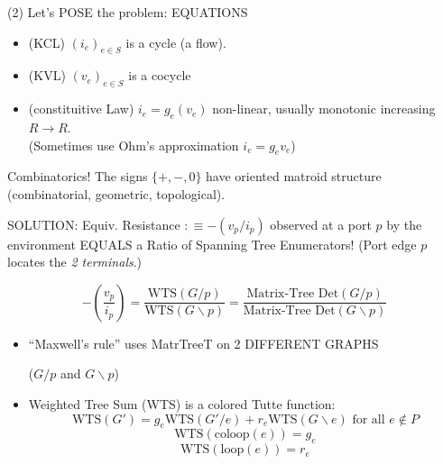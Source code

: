 \documentclass{beamer}
\begin{document}
\begin{frame}{(2) Let's POSE the problem: EQUATIONS}
\begin{itemize}
\item 
(KCL) $(i_e)_{e\in S}$ is a cycle (a flow).
\item
(KVL) $(v_e)_{e\in S}$ is a cocycle
\item
(constituitive Law) $i_e=g_e(v_e)$
non-linear, usually monotonic increasing $R\rightarrow R$.\\ 
(Sometimes use Ohm's approximation $i_e=g_ev_e$)
\end{itemize}
\begin{block}{Combinatorics!}
The signs $\{ +, -, 0\}$ have oriented matroid structure
(combinatorial, geometric, topological).
\end{block}
\end{frame}



\begin{frame}{SOLUTION: Equiv. Resistance $ :\equiv -(v_p/i_p)$
observed at a port $p$ by the environment
EQUALS a Ratio of Spanning Tree Enumerators!
(Port edge $p$ locates the \textit{2 terminals}.)}

\[
-(\frac{v_p}{i_p})=\frac{\mbox{WTS}(G/p)}
{\mbox{WTS}(G\backslash p)} 
= \frac{\mbox{Matrix-Tree Det}(G/p)}
       {\mbox{Matrix-Tree Det}(G\backslash p)}
\]
\begin{itemize}
\item
``Maxwell's rule'' uses MatrTreeT on 2 DIFFERENT GRAPHS\\
\begin{center}($G/p$ and $G\backslash p$)\end{center}
\item
Weighted Tree Sum (WTS) is a colored Tutte function:
\[
\mbox{WTS}(G') =
g_e \mbox{WTS}(G'/e) + r_e \mbox{WTS} (G \backslash e)
\text{\ for all\ }e \not\in P
\]
\[
\mbox{WTS}(\text{coloop}(e)) = g_e
\]
\[
\mbox{WTS}(\text{loop}(e)) = r_e
\]
\end{itemize}
\end{frame}
\end{document}
